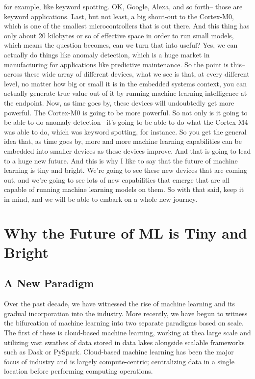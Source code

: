 for example, like keyword spotting.
OK, Google, Alexa, and so forth-- those are keyword applications.
Last, but not least, a big shout-out to the Cortex-M0,
which is one of the smallest microcontrollers that is out there.
And this thing has only about 20 kilobytes or so of effective space
in order to run small models, which means the question becomes,
can we turn that into useful?
Yes, we can actually do things like anomaly detection, which
is a huge market in manufacturing for applications
like predictive maintenance.
So the point is this--
across these wide array of different devices,
what we see is that, at every different level, no matter how big or small
it is in the embedded systems context, you
can actually generate true value out of it
by running machine learning intelligence at the endpoint.
Now, as time goes by, these devices will undoubtedly get more powerful.
The Cortex-M0 is going to be more powerful.
So not only is it going to be able to do anomaly detection-- it's
going to be able to do what the Cortex-M4 was able to do,
which was keyword spotting, for instance.
So you get the general idea that, as time goes by,
more and more machine learning capabilities can
be embedded into smaller devices as these devices improve.
And that is going to lead to a huge new future.
And this is why I like to say that the future of machine learning
is tiny and bright.
We're going to see these new devices that are coming out,
and we're going to see lots of new capabilities
that emerge that are all capable of running machine learning
models on them.
So with that said, keep it in mind, and we
will be able to embark on a whole new journey.

\section{Why the Future of ML is Tiny and Bright}

\subsection{A New Paradigm}

Over the past decade, we have witnessed the rise of machine learning and its gradual incorporation into the industry. More recently, we have begun to witness the bifurcation of machine learning into two separate paradigms based on scale. The first of these is cloud-based machine learning, working at thea large scale and utilizing vast swathes of data stored in data lakes alongside scalable frameworks such as Dask or PySpark. Cloud-based machine learning has been the major focus of industry and is largely compute-centric; centralizing data in a single location before performing computing operations.

